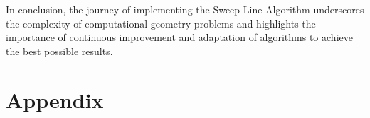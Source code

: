 \documentclass[10pt,a4paper,hidelinks]{article}
\begin{document}
In conclusion, the journey of implementing the Sweep Line Algorithm underscores the complexity of computational geometry problems and highlights the importance of continuous improvement and adaptation of algorithms to achieve the best possible results.

\section{Appendix}



\newpage
\listoffigures
\lstlistoflistings
\end{document}
